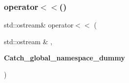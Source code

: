 \mbox{\label{catch_8hpp_acd0ce93733c8e6b594dc51388f3edbe8}} 
\subsubsection{operator$<$$<$()}
{\footnotesize\ttfamily std\+::ostream\& operator$<$$<$ (\begin{DoxyParamCaption}\item[{std\+::ostream \&}]{,  }\item[{\textbf{ Catch\+\_\+global\+\_\+namespace\+\_\+dummy}}]{ }\end{DoxyParamCaption})}

